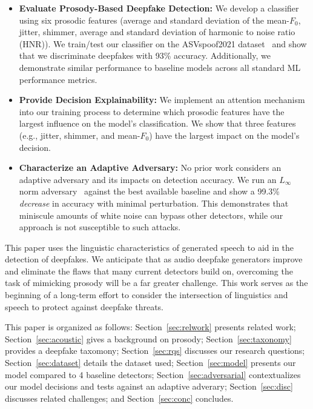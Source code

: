 \documentclass[10pt, journal, anonymous=true]{IEEEtran}
\begin{document}
\begin{itemize}

    \item {\bf Evaluate Prosody-Based Deepfake Detection:} We develop
	a classifier using six prosodic features (average and standard
	deviation of the mean-$F_0$, jitter, shimmer, average
	and standard deviation of harmonic to noise ratio (HNR)). We
	train/test our classifier on the ASVspoof2021
	dataset~\cite{yamagishi_asvspoof_2021} and show that we 
	discriminate deepfakes with 93\% accuracy. Additionally, we demonstrate 
    similar performance to baseline models across all standard ML performance
    metrics. 

    \item {\bf Provide Decision Explainability:} We implement an 
    attention mechanism into our training process to determine which prosodic features 
    have the largest influence on the model's classification. We show that three features 
    (e.g., jitter, shimmer, and mean-$F_0$) have the largest impact on the model's decision. 

    \item {\bf Characterize an Adaptive Adversary:}
	No prior work considers
	an adaptive adversary and its impacts on detection accuracy. We
	run an $L_{\infty}$ norm
	adversary~\cite{kurakin2016adversarial} against the best
	available baseline and show a 99.3\% \emph{decrease} in
	accuracy with minimal perturbation. 
	This demonstrates that miniscule amounts of white noise
	can bypass other detectors, while our approach is not susceptible 
	to such attacks.

\end{itemize}

This paper uses the linguistic characteristics of generated speech to aid in the detection of deepfakes. We anticipate that as audio deepfake generators improve and eliminate the flaws
that many current detectors build on, overcoming the task of mimicking prosody will be a far greater challenge. This work serves as the beginning of a long-term effort to consider the
intersection of linguistics and speech to protect against deepfake threats. 


This paper is organized as follows:
Section~\ref{sec:relwork} presents
related work; Section~\ref{sec:acoustic} gives a background on prosody;
Section~\ref{sec:taxonomy} provides a deepfake taxomony; 
Section~\ref{sec:rqs} discusses our research questions; 
Section~\ref{sec:dataset} details the dataset used;
Section~\ref{sec:model} presents our model compared to 4 baseline detectors; 
Section~\ref{sec:adversarial} contextualizes our model decisions and tests against an adaptive adverary;
Section~\ref{sec:disc} discusses
related challenges; and Section~\ref{sec:conc} concludes.
\end{document}
